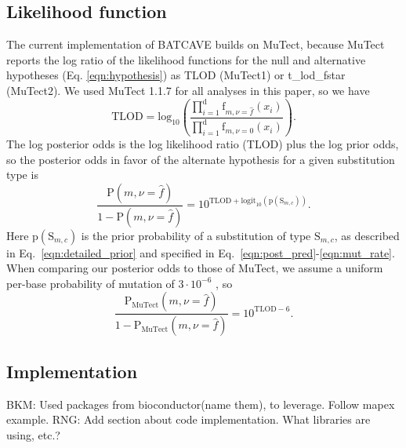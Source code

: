 \documentclass[a4,center,fleqn]{NAR}
\newcommand{\rngcomment}[1]{{\color{red}RNG: #1}}
\newcommand{\bkmcomment}[1]{{\color{blue}BKM: #1}}
\newcommand{\batcave}{BATCAVE }
\begin{document}
\subsection{Likelihood function}
The current implementation of \batcave builds on MuTect, because MuTect reports the log ratio of the likelihood functions for the null and alternative hypotheses (Eq. \ref{eqn:hypothesis}) as \textrm{TLOD} (MuTect1) or \textrm{t\_lod\_fstar} (MuTect2).
We used MuTect 1.1.7 for all analyses in this paper, so we have
\begin{equation}
  \label{eqn:tlod}
    \mathrm{TLOD} = \mathrm{log}_{10}\left(\frac{\prod_{i=1}^{\mathrm{d}} \textrm{f}_{m,\nu = \hat{f}}(x_i)}{\prod_{i=1}^{\mathrm{d}} \textrm{f}_{m,\nu = 0}(x_i)}\right).
\end{equation}
The log posterior odds is the log likelihood ratio (\textrm{TLOD}) plus the log prior odds, so the posterior odds in favor of the alternate hypothesis for a given substitution type is
\begin{equation}
  \label{eqn:computed_posterior}
  \frac{\mathrm{P}(m,\nu = \hat{f})}{1 - \mathrm{P}(m,\nu = \hat{f})} = 10^{\mathrm{TLOD} + \mathrm{logit}_{10}(\mathrm{p}(\mathrm{S}_{m,c}))}.
\end{equation}
Here $\mathrm{p}(\mathrm{S}_{m,c})$ is the prior probability of a substitution of type $\mathrm{S}_{m,c}$, as described in Eq.~\ref{eqn:detailed_prior} and specified in Eq.~\ref{eqn:post_pred}-\ref{eqn:mut_rate}.
When comparing our posterior odds to those of MuTect, we assume a uniform per-base probability of mutation of $3\cdot10^{-6}$ \cite{Cibulskis2013}, so
\begin{equation}  \label{eqn:mutect_posterior}
  \frac{\mathrm{P}_\mathrm{MuTect}(m,\nu = \hat{f})}{1 - \mathrm{P}_\mathrm{MuTect}(m,\nu = \hat{f})} = 10^{\mathrm{TLOD} - 6}.
\end{equation}

\subsection{Implementation}
\bkmcomment{Used packages from bioconductor(name them), to leverage. Follow mapex example.}
\rngcomment{Add section about code implementation. What libraries are using, etc.?}
\end{document}
